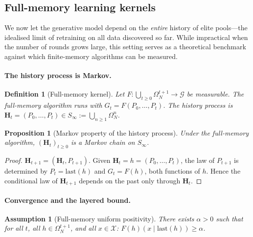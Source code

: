 \documentclass[11pt,a4paper]{article}
\newtheorem{proposition}[theorem]{Proposition}
\newtheorem{definition}[theorem]{Definition}
\newtheorem{assumption}{Assumption}   %
\newcommand{\X}{\mathcal{X}}
\newcommand{\G}{\mathcal{G}}
\newcommand{\Omn}{\Omega_N}
\begin{document}
\subsection{Full-memory learning kernels}
\label{sec:full}

We now let the generative model depend on the \emph{entire} history of
elite pools---the idealised limit of retraining on all data discovered
so far.  While impractical when the number of rounds grows large, this
setting serves as a theoretical benchmark against which finite-memory
algorithms can be measured.

\paragraph{The history process is Markov.}

\begin{definition}[Full-memory kernel]\label{def:full}
  Let $F\colon\bigcup_{t\ge0}\Omn^{t+1}\to\G$ be measurable.  The
  \emph{full-memory} algorithm runs  with
  $G_t=F(P_0,\dots,P_t)$.  The \emph{history process} is
  $\mathbf{H}_t=(P_0,\dots,P_t)\in S_\infty:=\bigcup_{n\ge1}\Omn^n$.
\end{definition}

\begin{proposition}[Markov property of the history process]
\label{prop:history-markov}
  Under the full-memory algorithm, $(\mathbf{H}_t)_{t\ge0}$ is a Markov
  chain on $S_\infty$.
\end{proposition}

\begin{proof}
  $\mathbf{H}_{t+1}=(\mathbf{H}_t,P_{t+1})$.  Given
  $\mathbf{H}_t=h=(P_0,\dots,P_t)$, the law of $P_{t+1}$ is determined by
  $P_t=\mathrm{last}(h)$ and $G_t=F(h)$, both functions of $h$.  Hence
  the conditional law of $\mathbf{H}_{t+1}$ depends on the past only
  through $\mathbf{H}_t$.
\end{proof}

\paragraph{Convergence and the layered bound.}

\begin{assumption}[Full-memory uniform positivity]\label{ass:full-pos}
  There exists $\alpha>0$ such that for all $t$, all $h\in\Omn^{t+1}$,
  and all $x\in\X$: $F(h)(x\mid\mathrm{last}(h))\ge\alpha$.
\end{assumption}
\end{document}
